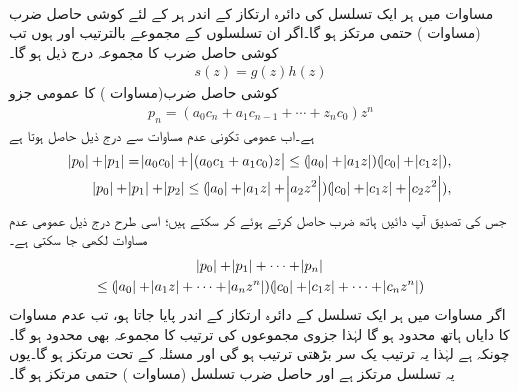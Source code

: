 \quad {}\\
مساوات  میں ہر ایک تسلسل کی دائرہ ارتکاز کے اندر ہر  کے لئے کوشی حاصل ضرب  (مساوات ) حتمی مرتکز ہو گا۔اگر ان تسلسلوں کے مجموعے بالترتیب  اور  ہوں تب کوشی حاصل ضرب کا مجموعہ درج ذیل ہو گا۔
\begin{align}\label{مساوات_ٹیلر_کوشی_حاصل_ضرب_پ}
s(z)=g(z)h(z)
\end{align}
\quad
کوشی حاصل ضرب(مساوات ) کا عمومی جزو 
\begin{align*}
p_n=(a_0c_n+a_1c_{n-1}+\cdots+z_nc_0)z^n
\end{align*}
ہے۔اب عمومی تکونی عدم مساوات  سے درج ذیل حاصل ہوتا ہے
\begin{align*}
\abs{p_0}+\abs{p_1}=\abs{a_0c_0}+\abs{(a_0c_1+a_1c_0)z}\le (\abs{a_0}+\abs{a_1z})(\abs{c_0}+\abs{c_1z}),\\
\abs{p_0}+\abs{p_1}+\abs{p_2}\le (\abs{a_0}+\abs{a_1z}+\abs{a_2z^2})(\abs{c_0}+\abs{c_1z}+\abs{c_2z^2}),
\end{align*}
جس کی تصدیق آپ دائیں ہاتھ ضرب حاصل کرتے ہوئے کر سکتے ہیں؛ اسی طرح درج ذیل عمومی عدم مساوات لکھی جا سکتی ہے۔
\begin{multline}\label{مساوات_ٹیلر_کوشی_حاصل_ضرب_ت}
\abs{p_0}+\abs{p_1}+\cdots+\abs{p_n}\\
\le (\abs{a_0}+\abs{a_1z}+\cdots+\abs{a_nz^n})(\abs{c_0}+\abs{c_1z}+\cdots+\abs{c_nz^n})
\end{multline} 
اگر   مساوات  میں ہر ایک تسلسل کے دائرہ ارتکاز کے اندر پایا جاتا ہو، تب  عدم مساوات  کا دایاں ہاتھ محدود ہو گا لہٰذا جزوی مجموعوں کی ترتیب کا مجموعہ   بھی محدود ہو گا۔چونکہ  ہے لہٰذا یہ ترتیب یک سر بڑھتی ترتیب ہو گی اور  مسئلہ   کے تحت مرتکز ہو گا۔یوں یہ تسلسل مرتکز ہے اور حاصل ضرب تسلسل (مساوات ) حتمی مرتکز ہو گا۔ 

